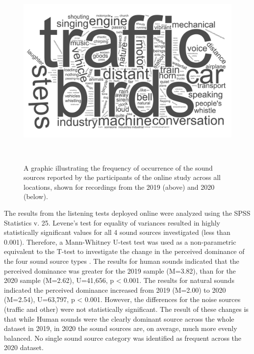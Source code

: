 \documentclass[
  authoryear,
  preprint,
  3p,
  onecolumn]{elsarticle}
\begin{document}
\begin{figure}
\begin{minipage}[t]{0.50\linewidth}
{{\includegraphics{Figure3b.jpg}

}

}

\end{minipage}%
%
\begin{minipage}[t]{0.25\linewidth}

{\centering 

~

}

\end{minipage}%

\caption{\label{fig-wordclo}A graphic illustrating the frequency of
occurrence of the sound sources reported by the participants of the
online study across all locations, shown for recordings from the 2019
(above) and 2020 (below).}

\end{figure}

The results from the listening tests deployed online were analyzed using
the SPSS Statistics v. 25. Levene's test for equality of variances
resulted in highly statistically significant values for all 4 sound
sources investigated (less than 0.001). Therefore, a Mann-Whitney U-test
test was used as a non-parametric equivalent to the T-test to
investigate the change in the perceived dominance of the four sound
source types \citep{McKnight2010Mann}. The results for human sounds
indicated that the perceived dominance was greater for the 2019 sample
(M=3.82), than for the 2020 sample (M=2.62), U=41,656, p \textless{}
0.001. The results for natural sounds indicated the perceived dominance
increased from 2019 (M=2.00) to 2020 (M=2.54), U=63,797, p \textless{}
0.001. However, the differences for the noise sources (traffic and
other) were not statistically significant. The result of these changes
is that while Human sounds were the clearly dominant source across the
whole dataset in 2019, in 2020 the sound sources are, on average, much
more evenly balanced. No single sound source category was identified as
frequent across the 2020 dataset.
\end{document}

